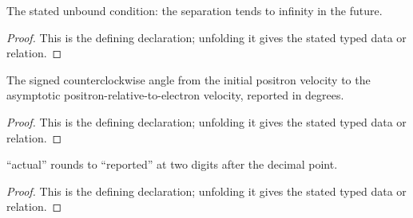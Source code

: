 \begin{definition}[IsUnbound]
  \label{decl:physics:IPhO_2026_1_B_2:IsUnbound}
  The stated unbound condition: the separation tends to infinity in the future.
\end{definition}
\begin{proof}
  This is the defining declaration; unfolding it gives the stated typed data or relation.
\end{proof}

\begin{definition}[signedDeflectionDegrees]
  \label{decl:physics:IPhO_2026_1_B_2:signedDeflectionDegrees}
  The signed counterclockwise angle from the initial positron velocity to the asymptotic positron-relative-to-electron velocity, reported in degrees.
\end{definition}
\begin{proof}
  This is the defining declaration; unfolding it gives the stated typed data or relation.
\end{proof}

\begin{definition}[RoundsToNearestHundredth]
  \label{decl:physics:IPhO_2026_1_B_2:RoundsToNearestHundredth}
  “actual” rounds to “reported” at two digits after the decimal point.
\end{definition}
\begin{proof}
  This is the defining declaration; unfolding it gives the stated typed data or relation.
\end{proof}

